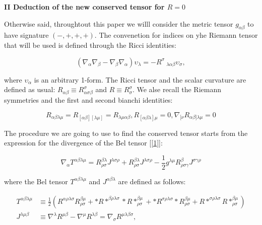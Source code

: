 \documentclass{article}
\begin{document}
 
 \textbf{\Large II Deduction of the new conserved tensor for $R=0$ }
 
 Otherwise said, throughtout this paper we willl consider the metric tensor  $g_{\alpha\beta}$ to have signature $\left(-,+,+,+\right)$. The convenetion for indices on yhe Riemann tensor that will be used is defined through the Ricci identities:
 
 
 \begin{equation} \label{1}
     \left(\nabla_{\alpha}\nabla_{\beta}-\nabla_{\beta}\nabla_{\alpha}\right)\upsilon_{\lambda}=-R^{\sigma}\ _{\lambda\alpha\beta} \upsilon_{\sigma},
 \end{equation}
 
 where $\upsilon_{\alpha}$ is an arbitrary 1-form. The Ricci tensor and the scalar curvature are defined as usual: $ R_{\alpha\beta}\equiv R^{\sigma}_{\alpha\sigma\beta}$ and $R\equiv R^{\sigma}_{\sigma}$. We alse recall the Riemann symmetries and the first and second bianchi identities:
 
 \begin{equation}
   R_{\alpha\beta\lambda\mu}=R_{[\alpha\beta][\lambda\mu]}=R_{\lambda\mu\alpha\beta},    R_{[\alpha\beta\lambda]\mu}=0,
    \nabla_ {[\nu} R_{\alpha\beta]{\lambda\mu}}=0  
 \end{equation}
 
The procedure we are going to use to find the conserved tensor starts from the expression for the divergence of the Bel tensor [\ref{1}]:

\begin{equation}
     \nabla_{\alpha}T^{\alpha\beta\lambda\mu}=R^{\beta\lambda}_{\rho\sigma}J^{\lambda\sigma\rho}+R^{\beta\lambda}_{\rho\sigma}J^{\lambda\sigma\rho}-\frac{1}{2}g^{\lambda\mu}R^{\beta}_{\rho\sigma\gamma}J^{\sigma\gamma\rho}
\end{equation}

where the Bel tensor $T^{\alpha\beta\lambda\mu}$ and $J^{\alpha\beta\lambda}$ are defined as follows:

\begin{equation} \label{eq1} 
\begin{split}
    T^{\alpha\beta\lambda\mu} & \equiv \frac{1}{2}\left(R^{\alpha\rho\lambda\sigma}R^{\beta\mu}_{\rho\sigma}+\ast R\ast ^{\beta\rho\lambda\sigma}\ast R\ast^{\beta\mu}_{\rho\sigma}+\ast R^{\sigma\rho\lambda\sigma}\ast R^{\beta\mu}_{\rho\sigma}+ R\ast^{\sigma\rho\lambda\sigma} R\ast^{\beta\mu}_{\rho\sigma} \right) \\
    J^{\lambda\mu\beta}& \equiv \nabla^{\lambda}R^{\mu\beta}-\nabla^{\mu}R^{\lambda\beta}= \nabla _{\sigma}R^{\mu\lambda\beta\sigma},
\end{split}
\end{equation}
\end{document}
